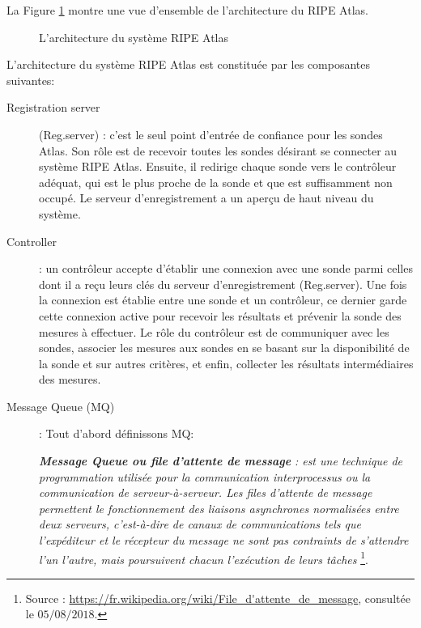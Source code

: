 La Figure  \ref{fig:archi-ripe-atlas} montre une vue d'ensemble de l'architecture du RIPE Atlas.

\begin{figure}[H]
	\centering
	\resizebox{\textwidth}{!}{
		 
	}
	\caption{L'architecture du système  RIPE Atlas  }
	\label{fig:archi-ripe-atlas}
\end{figure}

L'architecture du système  RIPE Atlas est constituée par  les composantes suivantes:
\begin{description}
	\item [Registration server] (Reg.server) : c'est le seul point d'entrée de confiance pour les sondes Atlas. Son rôle est de recevoir toutes les sondes désirant se connecter au système RIPE Atlas. Ensuite, il redirige chaque sonde vers le contrôleur adéquat, qui est le plus proche de la sonde et que est  suffisamment non occupé.  Le serveur d'enregistrement  a un aperçu de haut niveau du système.
	
	\item [Controller]: un contrôleur accepte d'établir une connexion avec une sonde parmi celles dont il a reçu leurs clés du serveur d'enregistrement (Reg.server). Une fois la connexion est établie entre une sonde et un contrôleur, ce dernier garde cette connexion active pour recevoir les résultats et prévenir la sonde des mesures à effectuer.  Le rôle du contrôleur est de communiquer avec les sondes,  associer les mesures aux sondes en se basant sur la disponibilité de la sonde et sur autres critères, et enfin, collecter les résultats intermédiaires des mesures.
	
	\item [Message Queue (MQ)] : Tout d'abord définissons MQ:
	
	\begin{tcolorbox}[title=Message Queue]
		\og    \textbf{\textit{Message Queue ou file d'attente de message}} \textit{:  est une technique de programmation utilisée pour la communication interprocessus ou la communication de serveur-à-serveur. Les files d'attente de message permettent le fonctionnement des liaisons asynchrones normalisées entre deux serveurs, c'est-à-dire de canaux de communications tels que l'expéditeur et le récepteur du message ne sont pas contraints de s'attendre l'un l'autre, mais poursuivent chacun l'exécution de leurs tâches} \footnote{Source : \url{https://fr.wikipedia.org/wiki/File\_d'attente\_de\_message}, consultée le $05/08/2018$.}. \fg{}
	\end{tcolorbox} 
	

\end{description}
